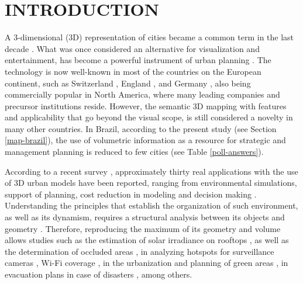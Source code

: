 \chapter{INTRODUCTION}\label{introducao}
A 3-dimensional (3D) representation of cities became a common term in the last decade \cite{demir2012}. What was once considered an alternative for visualization and entertainment, has become a powerful instrument of urban planning \cite{kolbe2009, stoter2011}. The technology is now well-known in most of the countries on the European continent, such as Switzerland \cite{swisstopo2010}, England \cite{accucities, vertex}, and Germany \cite{virtualcities, aringer2014, kruger2012, dollner2006}, also being commercially popular in North America, where many leading companies and precursor institutions reside. However, the semantic 3D mapping with features and applicability that go beyond the visual scope, is still considered a novelty in many other countries. In Brazil, according to the present study (see Section \ref{map-brazil}), the use of volumetric information as a resource for strategic and management planning is reduced to few cities (see Table \ref{poll-answers}).

According to a recent survey \cite{biljecki2015a}, approximately thirty real applications with the use of 3D urban models have been reported, ranging from environmental simulations, support of planning, cost reduction in modeling and decision making \cite{yang2016, truong2014}. Understanding the principles that establish the organization of such environment, as well as its dynamism, requires a structural analysis between its objects and geometry \cite{lafarge2015}. Therefore, reproducing the maximum of its geometry and volume allows studies such as the estimation of solar irradiance on rooftops \cite{biljecki2015b}, as well as the determination of occluded areas \cite{eicker2015, jochem2009}, in analyzing hotspots for surveillance cameras \cite{yaagoubi2015}, Wi-Fi coverage \cite{lee2015}, in the urbanization and planning of green areas \cite{tooke2011, ahmad2003}, in evacuation plans in case of disasters \cite{kwan2005}, among others. 

